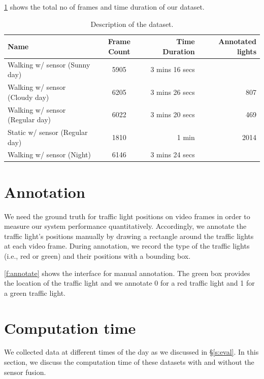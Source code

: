 \ref{t:dataset} shows the total no of frames and time duration of our dataset.

\begin{table}[ht!]
  \centering
  \caption{Description of the dataset.}
  \label{t:dataset}
  \begin{tabular}{  l  c  r r }
    \rowcolor{gray!50}
    Name & Frame Count & Time Duration & Annotated lights\\
    \hline
    Walking w/ sensor (Sunny day) & 5905 & 3 mins 16 secs &   \\
    Walking w/ sensor (Cloudy day) & 6205 & 3 mins 26 secs & 807\\
    Walking w/ sensor (Regular day) & 6022 & 3 mins 20 secs & 469\\
    Static w/ sensor (Regular day) & 1810 & 1 min & 2014\\
    Walking w/ sensor (Night) & 6146 & 3 mins 24 secs \\
    \hline
  \end{tabular}
\end{table}

\section{Annotation}
We need the ground truth for traffic light positions on video frames in order to measure our system performance quantitatively.
Accordingly, we annotate the traffic light's positions manually by drawing a rectangle around the traffic lights at each video frame.
During annotation, we record the type of the traffic lights (i.e., red or green) and their positions with a bounding box.

\ref{f:annotate} shows the interface for manual annotation.
The green box provides the location of the traffic light and we annotate 0 for a red traffic light and 1 for a green traffic light.




\section{Computation time}
We collected data at different times of the day as we discussed in \S\ref{s:eval}.
In this section, we discuss the computation time of these datasets with and without the sensor fusion.

